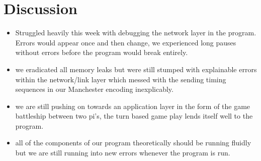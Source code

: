 \documentclass{article}
\begin{document}
\section*{Discussion}
\begin{itemize}
\item Struggled heavily this week with debugging the network layer in the program. Errors would appear once and then change, we experienced long pauses without errors before the program would break entirely.
\item we eradicated all memory leaks but were still stumped with explainable errors within the network/link layer which messed with the sending timing sequences in our Manchester encoding inexplicably.
\item we are still pushing on towards an application layer in the form of the game battleship between two pi's, the turn based game play lends itself well to the program. 
\item all of the components of our program theoretically should be running fluidly but we are still running into new errors whenever the program is run.

\end{itemize}
\end{document}
